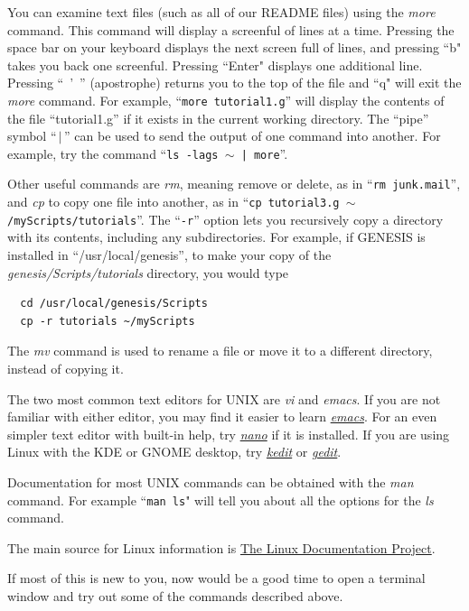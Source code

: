 \documentclass[12pt]{article}
\begin{document}
You can examine text files (such as all of our README files) using the {\it more} command. This command will display a screenful of lines at a time. Pressing the space bar on your keyboard displays the next screen full of lines, and pressing ``b" takes you back one screenful. Pressing ``Enter" displays one additional line. Pressing ``\ '\ '' (apostrophe) returns you to the top of the file and ``q" will exit the {\it more} command. For example, ``{\tt more tutorial1.g}'' will display the contents of the file ``tutorial1.g'' if it exists in the current working directory. The ``pipe'' symbol ``\,$|$\,'' can be used to send the output of one command into another. For example, try the command ``{\tt ls -lags $\sim$ | more}''.

Other useful commands are {\it rm}, meaning remove or delete, as in ``{\tt rm junk.mail}'', and {\it cp} to copy one file into another, as in ``{\tt cp tutorial3.g $\sim$/myScripts/tutorials}''. The ``{\tt -r}'' option lets you recursively copy a directory with its contents, including any subdirectories. For example, if GENESIS is installed in ``/usr/local/genesis'', to make your copy of the {\it genesis/Scripts/tutorials} directory, you would type
\begin{verbatim}
  cd /usr/local/genesis/Scripts
  cp -r tutorials ~/myScripts
 \end{verbatim}
The {\it mv} command is used to rename a file or move it to a different directory, instead of copying it.

The two most common text editors for UNIX are {\it vi} and {\it emacs}. If you are not familiar with either editor, you may find it easier to learn \href{http://www.gnu.org/software/emacs/tour/}{\it emacs}. For an even simpler text editor with built-in help, try \href{http://www.nano-editor.org/}{\it nano} if it is installed. If you are using Linux with the KDE or GNOME desktop, try \href{http://linuxappfinder.com/package/kedit}{\it kedit} or \href{http://projects.gnome.org/gedit/}{\it gedit}.

Documentation for most UNIX commands can be obtained with the {\it man} command. For example ``{\tt man ls}" will tell you about all the options for the {\it ls} command.

The main source for Linux information is \href{http://www.tldp.org/ }{The Linux Documentation Project}.

If most of this is new to you, now would be a good time to open a terminal window and try out some of the commands described above.
\end{document}
